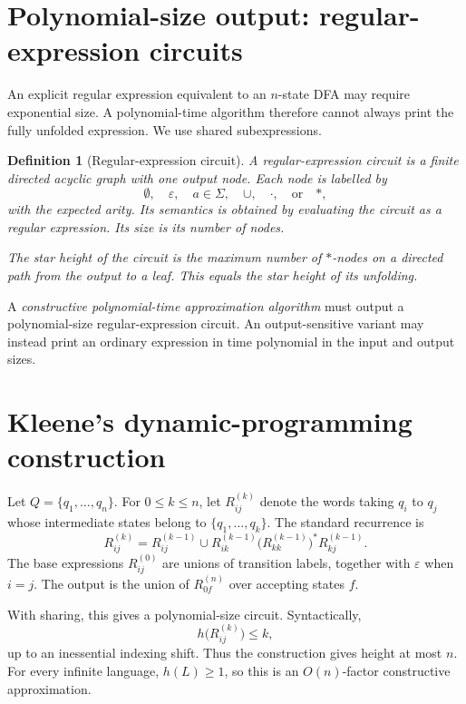 \documentclass[11pt]{article}
\newtheorem{definition}{Definition}
\begin{document}
\section{Polynomial-size output: regular-expression circuits}

An explicit regular expression equivalent to an $n$-state DFA may require
exponential size. A polynomial-time algorithm therefore cannot always print
the fully unfolded expression. We use shared subexpressions.

\begin{definition}[Regular-expression circuit]
A regular-expression circuit is a finite directed acyclic graph with one
output node. Each node is labelled by
\[
 \emptyset,\quad\varepsilon,\quad a\in\Sigma,\quad
 \cup,\quad\cdot,\quad\text{or}\quad *,
\]
with the expected arity. Its semantics is obtained by evaluating the circuit
as a regular expression. Its size is its number of nodes.

The star height of the circuit is the maximum number of $*$-nodes on a
directed path from the output to a leaf. This equals the star height of its
unfolding.
\end{definition}

A \emph{constructive polynomial-time approximation algorithm} must output a
polynomial-size regular-expression circuit. An output-sensitive variant may
instead print an ordinary expression in time polynomial in the input and
output sizes.

\section{Kleene's dynamic-programming construction}

Let $Q=\{q_1,\ldots,q_n\}$. For $0\leq k\leq n$, let
$R_{ij}^{(k)}$ denote the words taking $q_i$ to $q_j$ whose intermediate
states belong to $\{q_1,\ldots,q_k\}$. The standard recurrence is
\[
 R_{ij}^{(k)}
 =
 R_{ij}^{(k-1)}
 \cup
 R_{ik}^{(k-1)}
 \bigl(R_{kk}^{(k-1)}\bigr)^*
 R_{kj}^{(k-1)}.
\]
The base expressions $R_{ij}^{(0)}$ are unions of transition labels, together
with $\varepsilon$ when $i=j$. The output is the union of
$R_{0f}^{(n)}$ over accepting states $f$.

With sharing, this gives a polynomial-size circuit. Syntactically,
\[
 h\bigl(R_{ij}^{(k)}\bigr)\leq k,
\]
up to an inessential indexing shift. Thus the construction gives height at
most $n$. For every infinite language, $h(L)\geq1$, so this is an
$O(n)$-factor constructive approximation.
\end{document}
